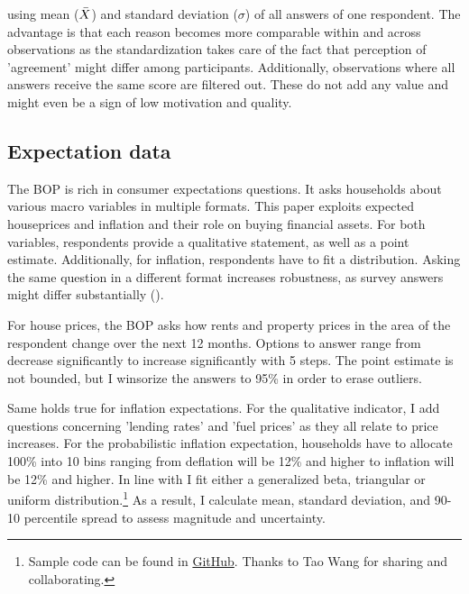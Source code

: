 \documentclass[ProjectABM]{subfiles}
\begin{document}
using mean ($\Bar{X}$) and standard deviation ($\sigma$) of all answers of one respondent. The advantage is that each reason becomes more comparable within and across observations as the standardization takes care of the fact that perception of 'agreement' might differ among participants. Additionally, observations where all answers receive the same score are filtered out. These do not add any value and might even be a sign of low motivation and quality.
 




\subsection{Expectation data}
The BOP is rich in consumer expectations questions. It asks households about various macro variables in multiple formats. This paper exploits expected houseprices and inflation and their role on buying financial assets. For both variables, respondents provide a qualitative statement, as well as a point estimate. Additionally, for inflation, respondents have to fit a distribution. Asking the same question in a different format increases robustness, as survey answers might differ substantially (\cite{potter_et_al_2017prob,diercks2021asymmetric}).

For house prices, the BOP asks how rents and property prices in the area of the respondent change over the next 12 months. Options to answer range from decrease significantly to increase significantly with 5 steps. The point estimate is not bounded, but I winsorize the answers to 95\% in order to erase outliers.

Same holds true for inflation expectations. For the qualitative indicator, I add questions concerning 'lending rates' and 'fuel prices' as they all relate to price increases. For the probabilistic inflation expectation, households have to allocate 100\% into 10 bins ranging from deflation will be 12\% and higher to inflation will be 12\% and higher. In line with \cite{engelberg_manski_2009distribution} I fit either a generalized beta, triangular or uniform distribution.\footnote{Sample code can be found in \href{https://github.com/AMonninger/DensitySurveyEstimation}{GitHub}. Thanks to Tao Wang for sharing and collaborating.} As a result, I calculate mean, standard deviation, and 90-10 percentile spread to assess magnitude and uncertainty.
\end{document}
